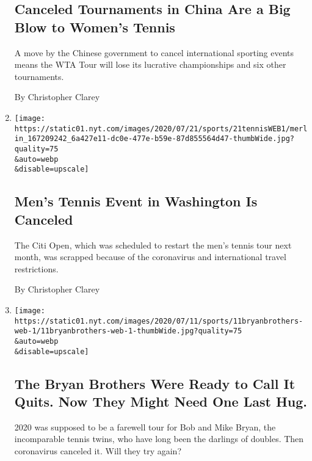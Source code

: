 \begin{enumerate}
  \hypertarget{canceled-tournaments-in-china-are-a-big-blow-to-womens-tennis}{%
  \subsection{Canceled Tournaments in China Are a Big Blow to Women's
  Tennis}\label{canceled-tournaments-in-china-are-a-big-blow-to-womens-tennis}}

  A move by the Chinese government to cancel international sporting
  events means the WTA Tour will lose its lucrative championships and
  six other tournaments.

  By Christopher Clarey
\item
  \href{/2020/07/21/sports/citi-open-washington-canceled.html}{}

  \texttt{[image: https://static01.nyt.com/images/2020/07/21/sports/21tennisWEB1/merlin\_167209242\_6a427e11-dc0e-477e-b59e-87d855564d47-thumbWide.jpg?quality=75\\\&auto=webp\\\&disable=upscale]}

  \hypertarget{mens-tennis-event-in-washington-is-canceled}{%
  \subsection{Men's Tennis Event in Washington Is
  Canceled}\label{mens-tennis-event-in-washington-is-canceled}}

  The Citi Open, which was scheduled to restart the men's tennis tour
  next month, was scrapped because of the coronavirus and international
  travel restrictions.

  By Christopher Clarey
\item
  \href{/2020/07/11/sports/tennis/Bryan-brothers.html}{}

  \texttt{[image: https://static01.nyt.com/images/2020/07/11/sports/11bryanbrothers-web-1/11bryanbrothers-web-1-thumbWide.jpg?quality=75\\\&auto=webp\\\&disable=upscale]}

  \hypertarget{the-bryan-brothers-were-ready-to-call-it-quits-now-they-might-need-one-last-hug}{%
  \subsection{The Bryan Brothers Were Ready to Call It Quits. Now They
  Might Need One Last
  Hug.}\label{the-bryan-brothers-were-ready-to-call-it-quits-now-they-might-need-one-last-hug}}

  2020 was supposed to be a farewell tour for Bob and Mike Bryan, the
  incomparable tennis twins, who have long been the darlings of doubles.
  Then coronavirus canceled it. Will they try again?


\end{enumerate}
